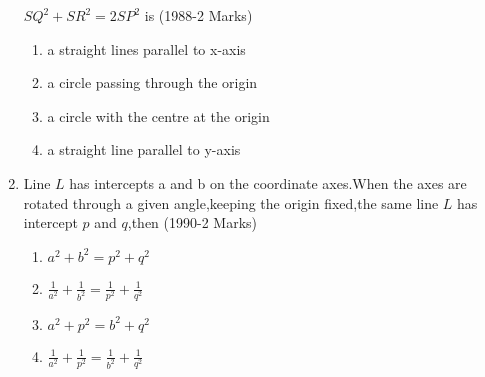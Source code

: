 \documentclass[journal,12pt,twocolumn]{IEEEtran}
\theoremstyle{remark}
\begin{document}
\begin{enumerate}
    $SQ^2+SR^2=2SP^2$ is 
    \hfill(1988-2 Marks)
    \begin{enumerate}
        \item a straight lines parallel to x-axis
        \item a circle passing through the origin
        \item a circle with the centre at the origin 
        \item a straight line parallel to y-axis
    \end{enumerate}
    \item Line $L$ has intercepts a and b on the coordinate axes.When the axes are rotated through a given angle,keeping the origin fixed,the same line $L$ has intercept $p$ and $q$,then 
    \hfill(1990-2 Marks)
    \begin{enumerate}
        \item $a^2+b^2=p^2+q^2$
        \item $\frac{1}{a^2}+\frac{1}{b^2}=\frac{1}{p^2}+\frac{1}{q^2}$
        \item $a^2+p^2=b^2+q^2$
        \item $\frac{1}{a^2}+\frac{1}{p^2}=\frac{1}{b^2}+\frac{1}{q^2}$
    \end{enumerate}
\end{enumerate}
\end{document}
